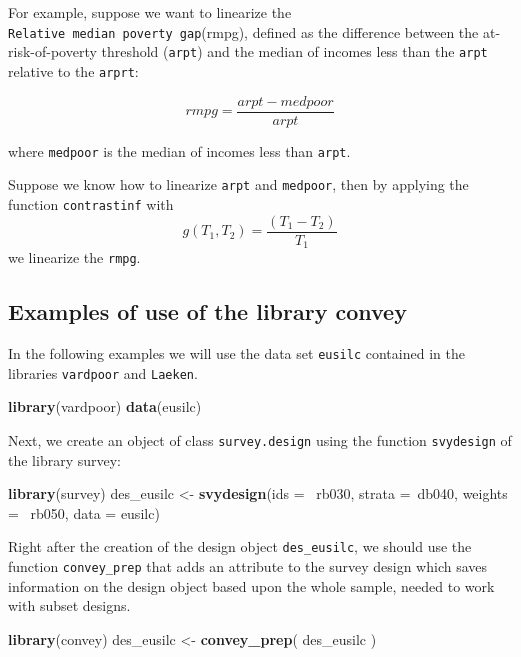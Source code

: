 \documentclass[]{book}
\newenvironment{Shaded}{\begin{snugshade}}{\end{snugshade}}
\newcommand{\KeywordTok}[1]{\textcolor[rgb]{0.13,0.29,0.53}{\textbf{{#1}}}}
\newcommand{\DataTypeTok}[1]{\textcolor[rgb]{0.13,0.29,0.53}{{#1}}}
\newcommand{\StringTok}[1]{\textcolor[rgb]{0.31,0.60,0.02}{{#1}}}
\newcommand{\NormalTok}[1]{{#1}}
\begin{document}
For example, suppose we want to linearize the
\texttt{Relative\ median\ poverty\ gap}(rmpg), defined as the difference
between the at-risk-of-poverty threshold (\texttt{arpt}) and the median
of incomes less than the \texttt{arpt} relative to the \texttt{arprt}:

\[
rmpg= \frac{arpt-medpoor} {arpt}
\]

where \texttt{medpoor} is the median of incomes less than \texttt{arpt}.

Suppose we know how to linearize \texttt{arpt} and \texttt{medpoor},
then by applying the function \texttt{contrastinf} with \[
g(T_1,T_2)= \frac{(T_1 - T_2)}{T_1}
\] we linearize the \texttt{rmpg}.

\subsection{Examples of use of the library
convey}\label{examples-of-use-of-the-library-convey}

In the following examples we will use the data set \texttt{eusilc}
contained in the libraries \texttt{vardpoor} and \texttt{Laeken}.

\begin{Shaded}
\begin{Highlighting}[]
\KeywordTok{library}\NormalTok{(vardpoor)}
\KeywordTok{data}\NormalTok{(eusilc)}
\end{Highlighting}
\end{Shaded}

Next, we create an object of class \texttt{survey.design} using the
function \texttt{svydesign} of the library survey:

\begin{Shaded}
\begin{Highlighting}[]
\KeywordTok{library}\NormalTok{(survey)}
\NormalTok{des_eusilc <-}\StringTok{ }\KeywordTok{svydesign}\NormalTok{(}\DataTypeTok{ids =} \NormalTok{~rb030, }\DataTypeTok{strata =}\NormalTok{~db040,  }\DataTypeTok{weights =} \NormalTok{~rb050, }\DataTypeTok{data =} \NormalTok{eusilc)}
\end{Highlighting}
\end{Shaded}

Right after the creation of the design object \texttt{des\_eusilc}, we
should use the function \texttt{convey\_prep} that adds an attribute to
the survey design which saves information on the design object based
upon the whole sample, needed to work with subset designs.

\begin{Shaded}
\begin{Highlighting}[]
\KeywordTok{library}\NormalTok{(convey)}
\NormalTok{des_eusilc <-}\StringTok{ }\KeywordTok{convey_prep}\NormalTok{( des_eusilc )}
\end{Highlighting}
\end{Shaded}
\end{document}
